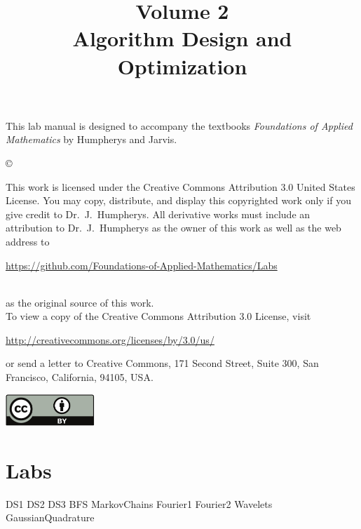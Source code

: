 \documentclass[opener-c,labs,red,nociteref]{HJnewsiambook}
\title{Volume 2\\ Algorithm Design and Optimization}
\begin{document}

\thispagestyle{empty} %
\maketitle
\thispagestyle{empty}
\frontmatter



\begin{thepreface} %

This lab manual is designed to accompany the textbooks \emph{Foundations of Applied Mathematics} by Humpherys and Jarvis.

\vfill
\copyright{This work is licensed under the Creative Commons Attribution 3.0 United States
License.  You may copy, distribute, and display this copyrighted work only if you give
credit to Dr.~J.~Humpherys. All derivative works must include an attribution to Dr.~J.~Humpherys as the owner of this work as well as the web address to
\\\centerline{\url{https://github.com/Foundations-of-Applied-Mathematics/Labs}}\\as the original source of this work.
\\To view a copy of the Creative Commons Attribution 3.0 License, visit
\\\centerline{\url{http://creativecommons.org/licenses/by/3.0/us/}} or send a letter to Creative Commons, 171 Second Street, Suite 300, San Francisco, California, 94105, USA.}

\vfill
\centering\includegraphics[height=1.2cm]{by.pdf}
\vfill
\end{thepreface}

\setcounter{tocdepth}{1}
\tableofcontents

\mainmatter %

\part{Labs}
{DS1}
{DS2}
{DS3}
{BFS}
{MarkovChains}
{Fourier1}
{Fourier2}
{Wavelets}
{GaussianQuadrature}
\end{document}
